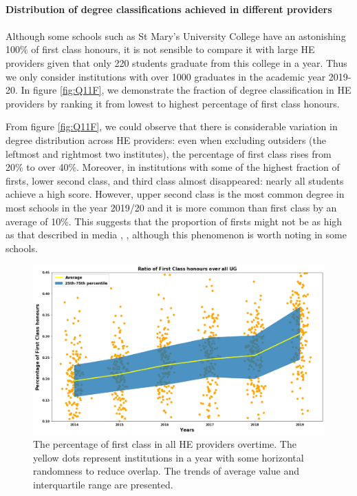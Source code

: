 \documentclass[11pt,a4paper]{article}
\begin{document}
\paragraph{Distribution of degree classifications achieved in different providers}  
\paragraph{}

Although some schools such as St Mary's University College have an astonishing 100\% of first class honours, it is not sensible to compare it with large HE providers given that only 220 students graduate from this college in a year. Thus we only consider institutions with over 1000 graduates in the academic year 2019-20. In figure \ref{fig:Q11F}, we demonstrate the fraction of degree classification in HE providers by ranking it from lowest to highest percentage of first class honours. 



From figure \ref{fig:Q11F}, we could observe that there is considerable variation in degree distribution across HE providers: even when excluding outsiders (the leftmost and rightmost two institutes), the percentage of first class rises from 20\% to over 40\%. Moreover, in institutions with some of the highest fraction of firsts, lower second class, and third class almost disappeared: nearly all students achieve a high score. However, upper second class is the most common degree in most schools in the year 2019/20 and it is more common than first class by an average of 10\%. This suggests that the proportion of firsts might not be as high as that described in media \cite{news1}, \cite{news2}, although this phenomenon is worth noting in some schools. 

\begin{figure}[h]
    \centering
    \includegraphics[width=15.24cm]{report/Q21FFF.pdf}
    \caption{The percentage of first class in all HE providers overtime. The yellow dots represent institutions in a year with some horizontal randomness to reduce overlap. The trends of average value and interquartile range are presented. }
    \label{fig:Q21}
\end{figure}
\end{document}
